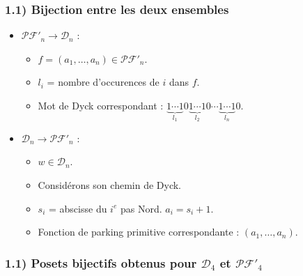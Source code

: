 \documentclass{beamer}
\begin{document}
\begin{frame} %
    \frametitle{1.1) \textbf{Bijection} entre les deux ensembles}
    \begin{itemize}
        \item $\mathcal{PF'}_n \to \mathcal{D}_n$ :
        \begin{itemize}
            \item $f = (a_1, \ldots, a_n) \in \mathcal{PF'}_n$.
            \item $l_i$ = nombre d'occurences de $i$ dans $f$.
            \item Mot de Dyck correspondant : $\underbrace{1 \cdots 1}_{l_1}
                0\underbrace{1 \cdots 1}_{l_2}0 \cdots\underbrace{1 \cdots
                1}_{l_n}0$.
        \end{itemize}
        \item $\mathcal{D}_n \to \mathcal{PF'}_n$ :
        \begin{itemize}
            \item $w \in \mathcal{D}_n$.
            \item Considérons son chemin de Dyck.
            \item $s_i$ = abscisse du $i^{e}$ pas Nord. $a_i = s_i + 1$.
            \item Fonction de parking primitive correspondante :
                $(a_1, \ldots, a_n)$.
        \end{itemize}
    \end{itemize}
\end{frame}

\begin{frame} %
    \frametitle{1.1) Posets \textbf{bijectifs} obtenus pour $\mathcal{D}_4$
        et $\mathcal{PF'}_4$}
    \begin{columns}
        \begin{column}{0.4\textwidth}
            \begin{center}
                
            \end{center}
        \end{column}
        \begin{column}{0.6\textwidth}
            \begin{center}
                
            \end{center}
        \end{column}
    \end{columns}
\end{frame}
\end{document}
